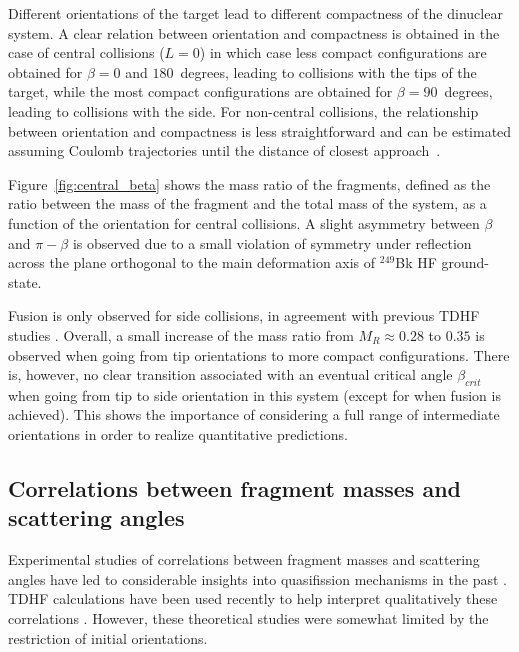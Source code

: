 Different orientations of the target lead to different compactness of the dinuclear system.
A clear relation between orientation and compactness is obtained in the case of central collisions ($L=0$) in which case less compact configurations are obtained for $\beta=0$ and $180$~degrees, leading to collisions with the tips of the target, while the most compact configurations are obtained for $\beta=90$~degrees, leading to collisions with the side.
For non-central collisions, the relationship between orientation and compactness is less straightforward and can be estimated assuming Coulomb trajectories until the distance of closest approach~\citep{wakhle2014}.


Figure~\ref{fig:central_beta} shows the mass ratio of the fragments, defined as the ratio between the mass of the fragment and the total mass of the system, as a function of the orientation for central collisions.
A slight asymmetry between $\beta$ and $\pi-\beta$ is observed due to a small violation of symmetry under reflection across the plane orthogonal to the main deformation axis of  $^{249}$Bk HF ground-state.

Fusion is only observed for side collisions, in agreement with previous TDHF studies \citep{wakhle2014,oberacker2014,umar2016}.
Overall, a small increase of the mass ratio from $M_R\approx0.28$ to $0.35$ is observed when going from tip orientations to more compact configurations.
There is, however, no clear transition associated with an eventual critical angle $\beta_{crit}$ when going from tip to side orientation in this system (except for when fusion is achieved).
This shows the importance of considering a full range of intermediate orientations in order to realize quantitative predictions.

\subsection{Correlations between fragment masses and scattering angles}\label{sec:MAD}

Experimental studies of correlations between fragment masses and scattering angles have led to considerable insights into quasifission mechanisms in the past \citep{toke1985,shen1987,hinde2008,simenel2012b,durietz2013,wakhle2014,hammerton2015,morjean2017,mohanto2018,hinde2018}.
TDHF calculations have been used recently to help interpret qualitatively these correlations \citep{wakhle2014,hammerton2015,umar2016,sekizawa2016}.
However, these theoretical studies were somewhat limited by the restriction of initial orientations.

